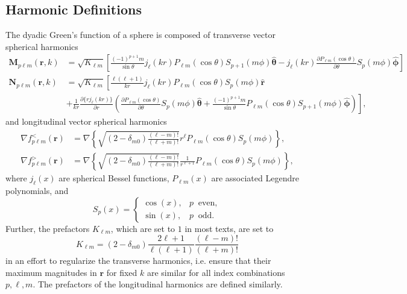 \documentclass{article}
\numberwithin{equation}{section}
\begin{document}
\subsection{Harmonic Definitions}\label{sec:harmDef}

The dyadic Green's function of a sphere is composed of transverse vector spherical harmonics
\begin{equation}
\begin{split}
\mathbf{M}_{p\ell m}(\mathbf{r},k) &= \sqrt{K_{\ell m}}\left[\frac{(-1)^{p + 1}m}{\sin\theta}j_\ell(kr)P_{\ell m}(\cos\theta)S_{p+1}(m\phi)\hat{\bm{\theta}} - j_\ell(kr)\frac{\partial P_{\ell m}(\cos\theta)}{\partial\theta}S_p(m\phi)\hat{\bm{\phi}}\right]\\[0.5em]
\mathbf{N}_{p\ell m}(\mathbf{r},k) &= \sqrt{K_{\ell m}}\left[\frac{\ell(\ell + 1)}{kr}j_\ell(kr)P_{\ell m}(\cos\theta)S_p(m\phi)\hat{\mathbf{r}}\right.\\
&+ \left.\frac{1}{kr}\frac{\partial\{rj_\ell(kr)\}}{\partial r}\left(\frac{\partial P_{\ell m}(\cos\theta)}{\partial\theta}S_p(m\phi)\hat{\bm{\theta}} + \frac{(-1)^{p+1}m}{\sin\theta}P_{\ell m}(\cos\theta)S_{p + 1}(m\phi)\hat{\bm{\phi}}\right)\right],
\end{split}
\end{equation}
and longitudinal vector spherical harmonics
\begin{equation}
\begin{split}
\nabla f_{p\ell m}^{<}(\mathbf{r}) &= \nabla\left\{\sqrt{(2 - \delta_{m0})\frac{(\ell - m)!}{(\ell + m)!}}r^\ell P_{\ell m}(\cos\theta)S_p(m\phi)\right\},\\
\nabla f_{p\ell m}^{>}(\mathbf{r}) &= \nabla\left\{\sqrt{(2 - \delta_{m0})\frac{(\ell - m)!}{(\ell + m)!}}\frac{1}{r^{\ell + 1}}P_{\ell m}(\cos\theta)S_p(m\phi)\right\},
\end{split}
\end{equation}
where $j_\ell(x)$ are spherical Bessel functions, $P_{\ell m}(x)$ are associated Legendre polynomials, and 
\begin{equation}
S_p(x) = 
\begin{cases}
\cos(x), & p\;\;\mathrm{even},\\
\sin(x), & p \;\;\mathrm{odd}.
\end{cases}
\end{equation}
Further, the prefactors $K_{\ell m}$, which are set to $1$ in most texts, are set to
\begin{equation}
K_{\ell m} = (2 - \delta_{m0})\frac{2\ell + 1}{\ell(\ell + 1)}\frac{(\ell - m)!}{(\ell + m)!}
\end{equation}
in an effort to regularize the transverse harmonics, i.e. ensure that their maximum magnitudes in $\mathbf{r}$ for fixed $k$ are similar for all index combinations $p,\ell,m$. The prefactors of the longitudinal harmonics are defined similarly.
\end{document}
